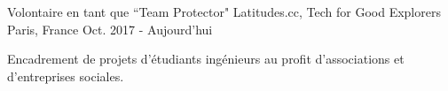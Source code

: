 \begin{cventries}
  \cventry
    {Volontaire en tant que ``Team Protector"}
    {Latitudes.cc, Tech for Good Explorers}
    {Paris, France}
    {Oct. 2017 - Aujourd'hui}
    {
      \begin{cvitems}
        \item {Encadrement de projets d'étudiants ingénieurs au profit d'associations et d'entreprises sociales.}
      \end{cvitems}
    }
\end{cventries}
